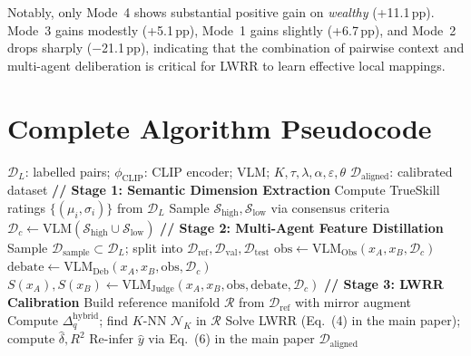 \documentclass[runningheads]{llncs}
\begin{document}
Notably, only Mode~4 shows substantial positive gain on \emph{wealthy} (+11.1\,pp).
Mode~3 gains modestly (+5.1\,pp), Mode~1 gains slightly (+6.7\,pp), and Mode~2 drops sharply ($-$21.1\,pp), indicating that the combination of pairwise context and multi-agent deliberation is critical for LWRR to learn effective local mappings.


\FloatBarrier
\section{Complete Algorithm Pseudocode}
\label{sec:algorithm}

\begin{algorithm}[H]
\caption{UrbanAlign: Post-hoc VLM Calibration for Urban Perception}
\label{alg:urbanalign}
\small
\begin{algorithmic}[1]
\REQUIRE $\mathcal{D}_{L}$: labelled pairs; $\phi_{\text{CLIP}}$: CLIP encoder; VLM; $K,\tau,\lambda,\alpha,\varepsilon,\theta$
\ENSURE $\mathcal{D}_{\mathrm{aligned}}$: calibrated dataset
\STATE \textbf{// Stage 1: Semantic Dimension Extraction}
\STATE Compute TrueSkill ratings $\{(\mu_i,\sigma_i)\}$ from $\mathcal{D}_{L}$
\STATE Sample $\mathcal{S}_{\mathrm{high}},\mathcal{S}_{\mathrm{low}}$ via consensus criteria
\STATE $\mathcal{D}_c \leftarrow \text{VLM}(\mathcal{S}_{\mathrm{high}}\cup\mathcal{S}_{\mathrm{low}})$ 
\STATE \textbf{// Stage 2: Multi-Agent Feature Distillation}
\STATE Sample $\mathcal{D}_{\mathrm{sample}}\subset\mathcal{D}_{L}$; split into $\mathcal{D}_{\mathrm{ref}}, \mathcal{D}_{\mathrm{val}}, \mathcal{D}_{\mathrm{test}}$
  \STATE $\text{obs}\leftarrow\text{VLM}_{\mathrm{Obs}}(x_A,x_B,\mathcal{D}_c)$
  \STATE $\text{debate}\leftarrow\text{VLM}_{\mathrm{Deb}}(x_A,x_B,\text{obs},\mathcal{D}_c)$
  \STATE $S(x_A),S(x_B)\leftarrow\text{VLM}_{\mathrm{Judge}}(x_A,x_B,\text{obs},\text{debate},\mathcal{D}_c)$
\ENDFOR
\STATE \textbf{// Stage 3: LWRR Calibration}
\STATE Build reference manifold $\mathcal{R}$ from $\mathcal{D}_{\mathrm{ref}}$ with mirror augment
  \STATE Compute $\Delta_q^{\mathrm{hybrid}}$; find $K$-NN $\mathcal{N}_K$ in $\mathcal{R}$
  \STATE Solve LWRR (Eq.~(4) in the main paper); compute $\hat{\delta}, R^{2}$
  \STATE Re-infer $\hat{y}$ via Eq.~(6) in the main paper
\ENDFOR
\RETURN $\mathcal{D}_{\mathrm{aligned}}$
\end{algorithmic}
\end{algorithm}
\end{document}
